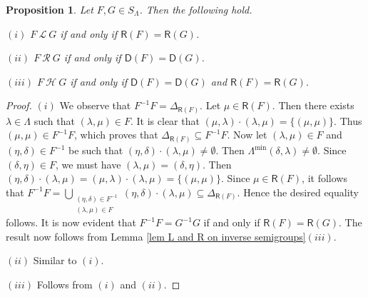 \documentclass[a4paper,reqno,11pt]{amsart}
\numberwithin{equation}{section}
\newtheorem{prop}[thm]{Proposition}
\theoremstyle{definition}
\theoremstyle{remark}
\begin{document}
\begin{prop}\label{pro the relations L,R,H}
Let $F,G\in S_\Lambda$. Then the following hold.

$(i)$ $F~\mathscr{L}~G$ if and only if $\mathsf{R}(F)=\mathsf{R}(G)$.

$(ii)$ $F~\mathscr{R}~G$ if and only if $\mathsf{D}(F)=\mathsf{D}(G)$.

$(iii)$ $F~\mathscr{H}~G$ if and only if $\mathsf{D}(F)=\mathsf{D}(G)$ and $\mathsf{R}(F)=\mathsf{R}(G)$.
\end{prop}
\begin{proof}
$(i)$ We observe that $F^{-1}F=\Delta_{\mathsf{R}(F)}$. Let $\mu\in \mathsf{R}(F)$. Then there exists $\lambda\in \Lambda$ such that $(\lambda,\mu)\in F$. It is clear that $(\mu,\lambda)\cdot (\lambda,\mu)=\{(\mu,\mu)\}$. Thus $(\mu,\mu)\in F^{-1}F$, which proves that $\Delta_{\mathsf{R}(F)}\subseteq F^{-1}F$. Now let $(\lambda,\mu)\in F$ and $(\eta,\delta)\in F^{-1}$ be such that $(\eta,\delta)\cdot (\lambda,\mu)\neq \emptyset$. Then $\Lambda^{\min}(\delta,\lambda)\neq \emptyset$. Since $(\delta,\eta)\in F$, we must have $(\lambda,\mu)=(\delta,\eta)$. Then $(\eta,\delta)\cdot (\lambda,\mu)=(\mu,\lambda)\cdot (\lambda,\mu)=\{(\mu,\mu)\}$. Since $\mu\in \mathsf{R}(F)$, it follows that $F^{-1}F=\displaystyle{\bigcup_{\substack{(\eta,\delta)\in F^{-1}\\(\lambda,\mu)\in F}}}(\eta,\delta)\cdot (\lambda,\mu)\subseteq \Delta_{\mathsf{R}(F)}$. Hence the desired equality follows. It is now evident that $F^{-1}F=G^{-1}G$ if and only if $\mathsf{R}(F)=\mathsf{R}(G)$. The result now follows from Lemma \ref{lem L and R on inverse semigroups}$(iii)$. 

$(ii)$ Similar to $(i)$.

$(iii)$ Follows from $(i)$ and $(ii)$.
\end{proof}
\end{document}
